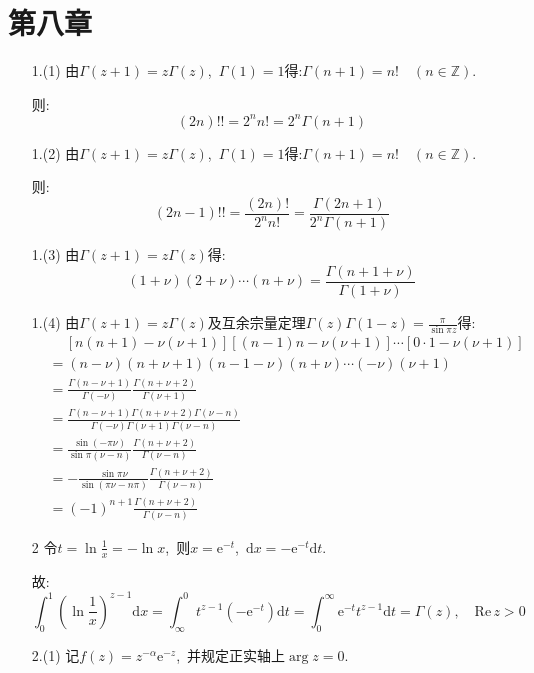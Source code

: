 \documentclass[a4paper,fontset=windows]{ctexart}
\begin{document}
\newpage
\section*{第八章}
\bigskip

\begin{itemize}
\item[1.(1)]
由$\Gamma(z+1)=z\Gamma(z)$,\ $\Gamma(1)=1$得:$\Gamma(n+1)=n!\quad(n\in\mathbb{Z})$.

则:
\[
(2n)!!
=2^nn!
=2^n\Gamma(n+1)
\]

\smallskip
\item[1.(2)]
由$\Gamma(z+1)=z\Gamma(z)$,\ $\Gamma(1)=1$得:$\Gamma(n+1)=n!\quad(n\in\mathbb{Z})$.

则:
\[
(2n-1)!!
=\frac{(2n)!}{2^nn!}
=\frac{\Gamma(2n+1)}{2^n\Gamma(n+1)}
\]

\smallskip
\item[1.(3)]
由$\Gamma(z+1)=z\Gamma(z)$得: 
\[
(1+\nu)(2+\nu)\dotsb(n+\nu)
=\frac{\Gamma(n+1+\nu)}{\Gamma(1+\nu)}
\]

\smallskip
\item[1.(4)]
由$\Gamma(z+1)=z\Gamma(z)$及互余宗量定理$\Gamma(z)\Gamma(1-z)=\frac{\pi}{\sin \pi z}$得: 
\begin{align*}
&\quad\ [n(n+1)-\nu(\nu+1)][(n-1)n-\nu(\nu+1)]\dotsb[0\cdot1-\nu(\nu+1)] \\
&=(n-\nu)(n+\nu+1)(n-1-\nu)(n+\nu)\dotsb(-\nu)(\nu+1) \\
&=\frac{\Gamma(n-\nu+1)}{\Gamma(-\nu)}\frac{\Gamma(n+\nu+2)}{\Gamma(\nu+1)} \\
&=\frac{\Gamma(n-\nu+1)\Gamma(n+\nu+2)\Gamma(\nu-n)}{\Gamma(-\nu)\Gamma(\nu+1)\Gamma(\nu-n)} \\
&=\frac{\sin(-\pi\nu)}{\sin\pi(\nu-n)}\frac{\Gamma(n+\nu+2)}{\Gamma(\nu-n)} \\
&=-\frac{\sin\pi\nu}{\sin(\pi\nu-n\pi)}\frac{\Gamma(n+\nu+2)}{\Gamma(\nu-n)} \\
&=(-1)^{n+1}\frac{\Gamma(n+\nu+2)}{\Gamma(\nu-n)}
\end{align*}

\bigskip
\item[2]
令$t=\ln\frac{1}{x}=-\ln x$,\ 则$x=\mathrm{e}^{-t}$,\ $\mathrm{d}x=-\mathrm{e}^{-t}\mathrm{d}t$.

故:
\[
\int_{0}^{1}\left(\ln\frac{1}{x}\right)^{z-1}\mathrm{d}x
=\int_{\infty}^{0}t^{z-1}\left(-\mathrm{e}^{-t}\right)\mathrm{d}t
=\int_{0}^{\infty}\mathrm{e}^{-t}t^{z-1}\mathrm{d}t
=\Gamma(z),\quad\mathrm{Re}\,z>0
\]

\bigskip
\item[2.(1)]
记$f(z)=z^{-\alpha}\mathrm{e}^{-z}$,\ 并规定正实轴上$\arg z=0$.


\end{itemize}
\end{document}

